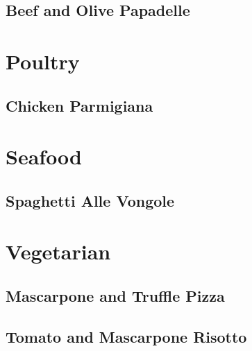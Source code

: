 \documentclass[a4paper, oneside]{book}
\begin{document}
\subsection{Beef and Olive Papadelle}
\section{Poultry}
\subsection{Chicken Parmigiana}
\section{Seafood}
\subsection{Spaghetti Alle Vongole}
\section{Vegetarian}
\subsection{Mascarpone and Truffle Pizza}
\subsection{Tomato and Mascarpone Risotto}
\end{document}
